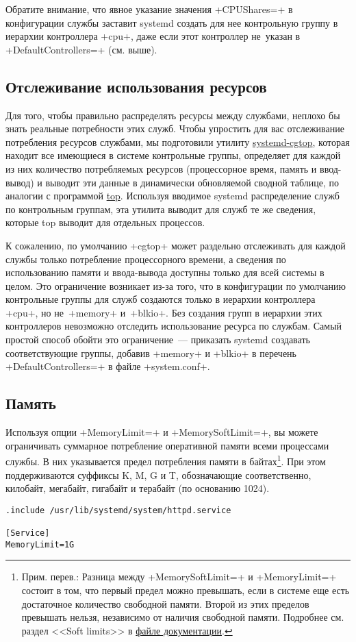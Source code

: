 \documentclass[10pt,oneside,a4paper]{article}
\begin{document}
Обратите внимание, что явное указание значения +CPUShares=+ в конфигурации
службы заставит systemd создать для нее контрольную группу в иерархии контроллера
+cpu+, даже если этот контроллер не~указан в +DefaultControllers=+ (см. выше).

\subsection{Отслеживание использования ресурсов}

Для того, чтобы правильно распределять ресурсы между службами, неплохо бы знать
реальные потребности этих служб. Чтобы упростить для вас отслеживание
потребления ресурсов службами, мы подготовили утилиту
\href{http://www.freedesktop.org/software/systemd/man/systemd-cgtop.html}{systemd-cgtop},
которая находит все имеющиеся в системе контрольные группы, определяет для
каждой из них количество потребляемых ресурсов (процессорное время, память и
ввод-вывод) и выводит эти данные в динамически обновляемой сводной таблице, по аналогии
с программой \href{http://linux.die.net/man/1/top}{top}. Используя вводимое
systemd распределение служб по контрольным группам, эта утилита выводит для
служб те же сведения, которые top выводит для отдельных процессов.

К сожалению, по умолчанию +cgtop+ может раздельно отслеживать для каждой службы
только потребление процессорного времени, а сведения по использованию памяти и
ввода-вывода доступны только для всей системы в целом. Это ограничение возникает
из-за того, что в конфигурации по умолчанию контрольные группы для служб
создаются только в иерархии контроллера +cpu+, но не~+memory+ и~+blkio+. Без
создания групп в иерархии этих контроллеров невозможно отследить использование
ресурса по службам. Самый простой способ обойти это ограничение~--- приказать
systemd создавать соответствующие группы, добавив +memory+ и +blkio+ в перечень
+DefaultControllers=+ в файле +system.conf+.

\subsection{Память}

Используя опции +MemoryLimit=+ и +MemorySoftLimit=+, вы можете ограничивать
суммарное потребление оперативной памяти всеми процессами службы.  В них
указывается предел потребления памяти в байтах\footnote{Прим. перев.: Разница
между +MemorySoftLimit=+ и +MemoryLimit=+ состоит в том, что первый предел можно
превышать, если в системе еще есть достаточное количество свободной памяти.
Второй из этих пределов превышать нельзя, независимо от наличия свободной
памяти. Подробнее см. раздел <<Soft limits>> в
\href{http://www.kernel.org/doc/Documentation/cgroups/memory.txt}{файле
документации}.}. При этом поддерживаются суффиксы K, M, G и T, обозначающие
соответственно, килобайт, мегабайт, гигабайт и терабайт (по основанию 1024).
\begin{Verbatim}
.include /usr/lib/systemd/system/httpd.service

[Service]
MemoryLimit=1G
\end{Verbatim}
\end{document}
